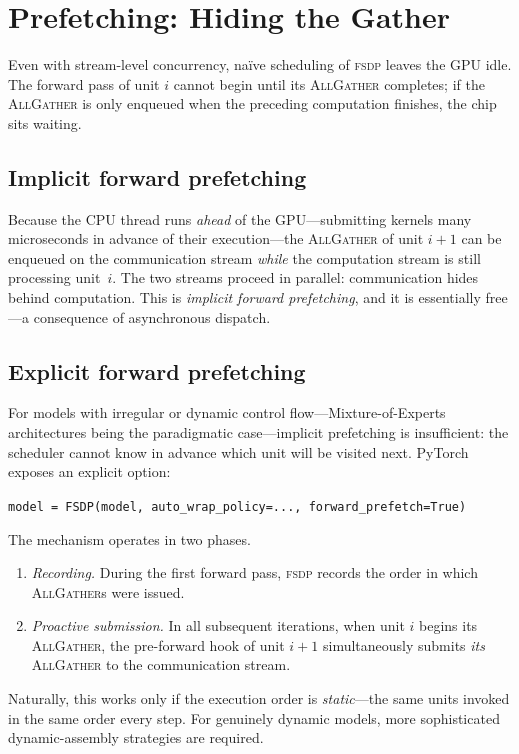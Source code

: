 \documentclass[11pt,a4paper]{article}
\theoremstyle{definition}
\theoremstyle{remark}
\newcommand{\FSDP}{\textsc{fsdp}}
\newcommand{\AllGather}{\textsc{AllGather}}
\newcommand{\code}[1]{\texttt{\small #1}}
\begin{document}
\section{Prefetching: Hiding the Gather}
\label{sec:prefetch}


Even with stream-level concurrency, na\"ive scheduling of \FSDP{} leaves the GPU idle. The forward pass of unit $i$ cannot begin until its \AllGather{} completes; if the \AllGather{} is only enqueued when the preceding computation finishes, the chip sits waiting.

\subsection{Implicit forward prefetching}

Because the CPU thread runs \emph{ahead} of the GPU---submitting kernels many microseconds in advance of their execution---the \AllGather{} of unit $i+1$ can be enqueued on the communication stream \emph{while} the computation stream is still processing unit~$i$. The two streams proceed in parallel: communication hides behind computation. This is \emph{implicit forward prefetching}, and it is essentially free---a consequence of asynchronous dispatch.

\subsection{Explicit forward prefetching}

For models with irregular or dynamic control flow---Mixture-of-Experts architectures being the paradigmatic case---implicit prefetching is insufficient: the scheduler cannot know in advance which unit will be visited next. PyTorch exposes an explicit option:
\begin{center}
\code{model = FSDP(model, auto\_wrap\_policy=..., forward\_prefetch=True)}
\end{center}
The mechanism operates in two phases.
\begin{enumerate}[leftmargin=2em, itemsep=0.15em]
    \item \emph{Recording.} During the first forward pass, \FSDP{} records the order in which \AllGather{}s were issued.
    \item \emph{Proactive submission.} In all subsequent iterations, when unit $i$ begins its \AllGather{}, the pre-forward hook of unit $i+1$ simultaneously submits \emph{its} \AllGather{} to the communication stream.
\end{enumerate}
Naturally, this works only if the execution order is \emph{static}---the same units invoked in the same order every step. For genuinely dynamic models, more sophisticated dynamic-assembly strategies are required.
\end{document}

